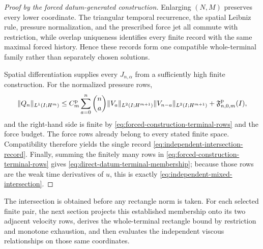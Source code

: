 \begin{proof}[Proof by the forced datum-generated construction]
Enlarging \((N,M)\) preserves every lower coordinate.  The triangular temporal
recurrence, the spatial Leibniz rule, pressure normalization, and the prescribed
force jet all commute with restriction, while overlap uniqueness identifies
every finite record with the same maximal forced history.  Hence these records
form one compatible whole-terminal family rather than separately chosen
solutions.

Spatial differentiation supplies every \(J_{n,\alpha}\) from a sufficiently
high finite construction.  For the normalized pressure rows,
\[
 \|Q_n\|_{L^1(I;H^m)}
 \le C_m^{\rm p}\sum_{a=0}^n\binom na
 \|V_a\|_{L^2(I;H^{m+1})}
 \|V_{n-a}\|_{L^2(I;H^{m+1})}
 +\mathfrak F^{\rm p}_{n,0,m}(I),
\]
and the right-hand side is finite by
\eqref{eq:forced-construction-terminal-rows} and the force budget.
The force rows already belong to every stated finite space.  Compatibility
therefore yields the single record
\eqref{eq:independent-intersection-record}.  Finally, summing the finitely many
rows in \eqref{eq:forced-construction-terminal-rows} gives
\eqref{eq:direct-datum-terminal-membership}; because those rows are the weak
time derivatives of \(u\), this is exactly
\eqref{eq:independent-mixed-intersection}.
\end{proof}

The intersection is obtained before any rectangle norm is taken.  For each
selected finite pair, the next section projects this established membership
onto its two adjacent velocity rows, derives the whole-terminal rectangle
bound by restriction and monotone exhaustion, and then evaluates the
independent viscous relationships on those same coordinates.
